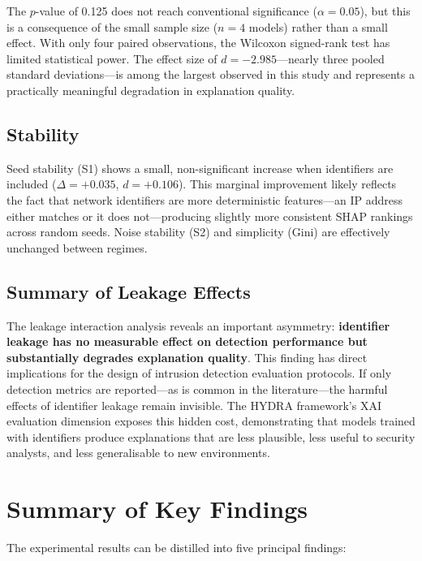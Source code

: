 \documentclass[12pt,a4paper]{report}
\begin{document}
The $p$-value of 0.125 does not reach conventional significance ($\alpha = 0.05$), but this is a consequence of the small sample size ($n = 4$ models) rather than a small effect. With only four paired observations, the Wilcoxon signed-rank test has limited statistical power. The effect size of $d = -2.985$---nearly three pooled standard deviations---is among the largest observed in this study and represents a practically meaningful degradation in explanation quality.

\subsection*{Stability}

Seed stability (S1) shows a small, non-significant increase when identifiers are included ($\Delta = +0.035$, $d = +0.106$). This marginal improvement likely reflects the fact that network identifiers are more deterministic features---an IP address either matches or it does not---producing slightly more consistent SHAP rankings across random seeds. Noise stability (S2) and simplicity (Gini) are effectively unchanged between regimes.

\subsection*{Summary of Leakage Effects}

The leakage interaction analysis reveals an important asymmetry: \textbf{identifier leakage has no measurable effect on detection performance but substantially degrades explanation quality}. This finding has direct implications for the design of intrusion detection evaluation protocols. If only detection metrics are reported---as is common in the literature---the harmful effects of identifier leakage remain invisible. The HYDRA framework's XAI evaluation dimension exposes this hidden cost, demonstrating that models trained with identifiers produce explanations that are less plausible, less useful to security analysts, and less generalisable to new environments.

\section{Summary of Key Findings}
\label{sec:results-summary}

The experimental results can be distilled into five principal findings:
\end{document}

